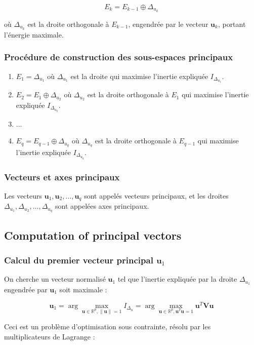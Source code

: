 \documentclass[10pt,a4paper]{article}
\begin{document}
\[
E_k = E_{k-1} \oplus \Delta_{u_k}
\]

où $\Delta_{u_k}$ est la droite orthogonale à $E_{k-1}$, engendrée par le vecteur $\mathbf{u}_k$, portant l'énergie maximale.

\subsubsection*{Procédure de construction des sous-espaces principaux}
\begin{enumerate}
    \item $E_1 = \Delta_{u_1}$ où $\Delta_{u_1}$ est la droite qui maximise l'inertie expliquée $I_{\Delta_{u_1}}$.
    \item $E_2 = E_1 \oplus \Delta_{u_2}$ où $\Delta_{u_2}$ est la droite orthogonale à $E_1$ qui maximise l'inertie expliquée $I_{\Delta_{u_2}}$.
    \item ...
    \item $E_q = E_{q-1} \oplus \Delta_{u_q}$ où $\Delta_{u_q}$ est la droite orthogonale à $E_{q-1}$ qui maximise l'inertie expliquée $I_{\Delta_{u_q}}$.
\end{enumerate}

\subsubsection*{Vecteurs et axes principaux}
Les vecteurs $\mathbf{u}_1, \mathbf{u}_2, \ldots, \mathbf{u}_q$ sont appelés vecteurs principaux, et les droites $\Delta_{u_1}, \Delta_{u_2}, \ldots, \Delta_{u_q}$ sont appelées axes principaux.

\subsection*{Computation of principal vectors}
\subsubsection*{Calcul du premier vecteur principal $\mathbf{u}_1$}
On cherche un vecteur normalisé $\mathbf{u}_1$ tel que l'inertie expliquée par la droite $\Delta_{u_1}$ engendrée par $\mathbf{u}_1$ soit maximale :

\[
\mathbf{u}_1 = \arg \max_{\mathbf{u} \in \mathbb{R}^p, \|\mathbf{u}\| = 1} I_{\Delta_u} = \arg \max_{\mathbf{u} \in \mathbb{R}^p, \mathbf{u}^T \mathbf{u} = 1} \mathbf{u}^T \mathbf{V} \mathbf{u}
\]

Ceci est un problème d'optimisation sous contrainte, résolu par les multiplicateurs de Lagrange :
\end{document}

